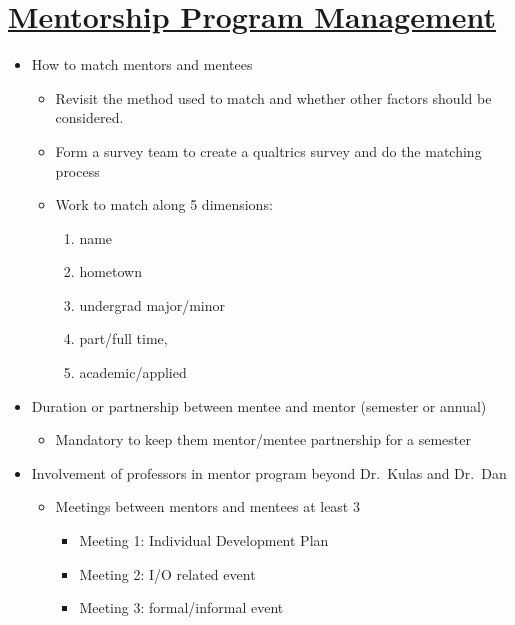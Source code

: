 \documentclass[
]{book}
\providecommand{\tightlist}{%
  \setlength{\itemsep}{0pt}\setlength{\parskip}{0pt}}
\begin{document}
\hypertarget{mentorship-program-management}{%
\section{\texorpdfstring{\href{https://bookdown.org/kulasj/mentoruser/}{Mentorship Program Management}}{Mentorship Program Management}}\label{mentorship-program-management}}

\begin{itemize}
\tightlist
\item
  How to match mentors and mentees

  \begin{itemize}
  \tightlist
  \item
    Revisit the method used to match and whether other factors should be considered.
  \item
    Form a survey team to create a qualtrics survey and do the matching process
  \item
    Work to match along 5 dimensions:

    \begin{enumerate}
    \def\labelenumi{\arabic{enumi}.}
    \tightlist
    \item
      name
    \item
      hometown
    \item
      undergrad major/minor
    \item
      part/full time,
    \item
      academic/applied
    \end{enumerate}
  \end{itemize}
\item
  Duration or partnership between mentee and mentor (semester or annual)

  \begin{itemize}
  \tightlist
  \item
    Mandatory to keep them mentor/mentee partnership for a semester
  \end{itemize}
\item
  Involvement of professors in mentor program beyond Dr.~Kulas and Dr.~Dan

  \begin{itemize}
  \tightlist
  \item
    Meetings between mentors and mentees at least 3

    \begin{itemize}
    \tightlist
    \item
      Meeting 1: Individual Development Plan
    \item
      Meeting 2: I/O related event
    \item
      Meeting 3: formal/informal event
    \end{itemize}
  \end{itemize}
\end{itemize}
\end{document}
